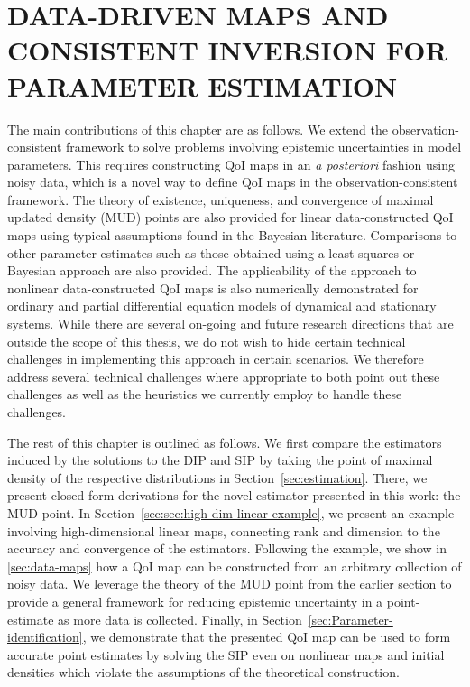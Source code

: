 \chapter{\uppercase{Data-Driven Maps and Consistent Inversion For Parameter Estimation} \label{chapter:mud}}

The main contributions of this chapter are as follows.
We extend the observation-consistent framework to solve problems involving epistemic uncertainties in model parameters.
This requires constructing QoI maps in an {\em a posteriori} fashion using noisy data, which is a novel way to define QoI maps in the observation-consistent framework.
The theory of existence, uniqueness, and convergence of maximal updated density (MUD) points are also provided for linear data-constructed QoI maps using typical assumptions found in the Bayesian literature.
Comparisons to other parameter estimates such as those obtained using a least-squares or Bayesian approach are also provided.
The applicability of the approach to nonlinear data-constructed QoI maps is also numerically demonstrated for ordinary and partial differential equation models of dynamical and stationary systems.
While there are several on-going and future research directions that are outside the scope of this thesis, we do not wish to hide certain technical challenges in implementing this approach in certain scenarios.
We therefore address several technical challenges where appropriate to both point out these challenges as well as the heuristics we currently employ to handle these challenges.


The rest of this chapter is outlined as follows.
We first compare the estimators induced by the solutions to the DIP and SIP by taking the point of maximal density of the respective distributions in Section~\ref{sec:estimation}.
There, we present closed-form derivations for the novel estimator presented in this work: the MUD point.
In Section~\ref{sec:sec:high-dim-linear-example}, we present an example involving high-dimensional linear maps, connecting rank and dimension to the accuracy and convergence of the estimators.
Following the example, we show in \ref{sec:data-maps} how a QoI map can be constructed from an arbitrary collection of noisy data.
We leverage the theory of the MUD point from the earlier section to provide a general framework for reducing epistemic uncertainty in a point-estimate as more data is collected.
Finally, in Section~\ref{sec:Parameter-identification}, we demonstrate that the presented QoI map can be used to form accurate point estimates by solving the SIP even on nonlinear maps and initial densities which violate the assumptions of the theoretical construction.

